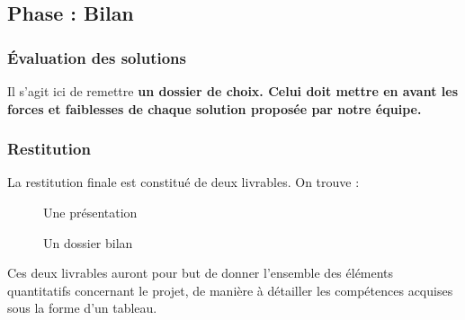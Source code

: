 \subsection{Phase : Bilan}

\subsubsection{Évaluation des solutions}

Il s’agit ici de remettre \bf{un dossier de choix}. Celui doit mettre en avant les forces et faiblesses de chaque solution proposée par notre équipe.

\subsubsection{Restitution}

La restitution finale est constitué de deux livrables. On trouve : \\

\begin{description}
    \item[\textbullet] Une présentation
    \item[\textbullet] Un dossier bilan \\
\end{description}

Ces deux livrables auront pour but de donner l’ensemble des éléments quantitatifs concernant le projet, de manière à détailler les compétences acquises sous la forme d’un tableau.
